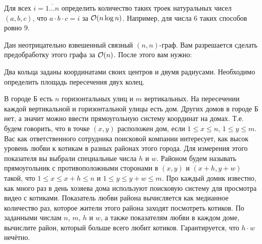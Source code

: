 \documentclass[addpoints]{exam}
\begin{document}
\begin{questions}
\question Для всех $i= \overline{1\ldots n}$ определить количество таких троек натуральных чисел $(a,b,c)$, что $a \cdot b \cdot c = i$ за $\mathcal{O}(n \log{n})$. Например, для числа $6$ таких способов ровно $9$.


\question Дан неотрицательно взвешенный связный $(n,n)$-граф. Вам разрешается сделать предобработку этого графа за $\mathcal{O}(n)$. После этого вам нужно:


\question[3] Два кольца заданы координатами своих центров и двумя радиусами. Необходимо определить площадь пересечения двух колец.

\question[3] В городе Б есть $n$ горизонтальных улиц и $m$ вертикальных. На пересечении каждой вертикальной и горизонтальной улицы есть дом. Других домов в городе Б нет, а значит можно ввести прямоугольную систему координат на домах. Т.е. будем говорить, что в точке $(x,y)$ расположен дом, если $1 \leqslant x \leqslant n$, $1 \leqslant y \leqslant m$. Вас как ответственного сотрудника поисковой компании интересует, как высок уровень любви к котикам в разных районах этого города. Для измерения этого показателя вы выбрали специальные числа $h$ и $w$. Районом будем называть прямоугольник с противоположными сторонами в $(x,y)$ и $(x+h,y+w)$ такой, что $1 \leqslant x \leqslant x + h \leqslant n$ и $1 \leqslant y \leqslant y + w \leqslant m$. Про каждый домик известно, как много раз в день хозяева дома используют поисковую систему для просмотра видео с котиками. Показатель любви района вычисляется как медианное количество раз, которое жители этого района заходят посмотреть котиков. По заданными числам $n$, $m$, $h$ и $w$, а также показателям любви в каждом доме, вычислите район, который больше всего любит котиков. Гарантируется, что $h \cdot w$ нечётно.


\end{questions}
\end{document}
